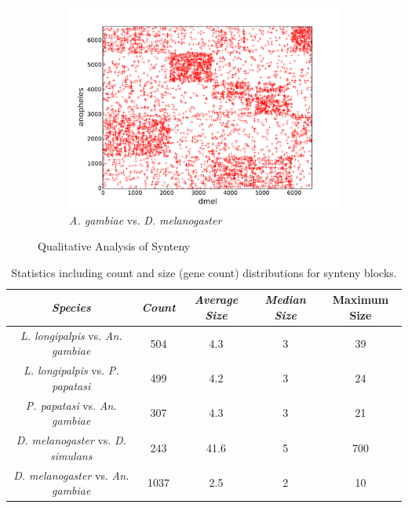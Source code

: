 \begin{figure}[H]
\begin{subfigure}[b]{0.45\textwidth}
    \includegraphics[width=\textwidth]{figures/synteny/dmel_anopheles_plot}
    \caption{\emph{A. gambiae} vs. \emph{D. melanogaster}}
    \label{fig:synteny-dotplots-anopheles-drosophila}
  \end{subfigure}
\label{fig:dot-plots}
\caption{Qualitative Analysis of Synteny}
\end{figure}

\begin{table}[H]
  \centering
  \begin{tabular}{c c c c c} \hline
    \emph{Species} & \emph{Count} & \emph{Average Size} & \emph{Median Size} & {Maximum Size} \\ \hline
    \emph{L. longipalpis} vs. \emph{An. gambiae} & 504 & 4.3 & 3 & 39 \\
    \emph{L. longipalpis} vs. \emph{P. papatasi} & 499 & 4.2 & 3 & 24 \\
    \emph{P. papatasi} vs. \emph{An. gambiae} & 307 & 4.3 & 3 & 21 \\
    \emph{D. melanogaster} vs. \emph{D. simulans} & 243 & 41.6 & 5 & 700 \\
    \emph{D. melanogaster} vs. \emph{An. gambiae} & 1037 & 2.5 & 2 & 10
  \end{tabular}
  \caption{Statistics including count and size (gene count) distributions for synteny blocks.}
  \label{tab:synteny-block-stats}
\end{table}




